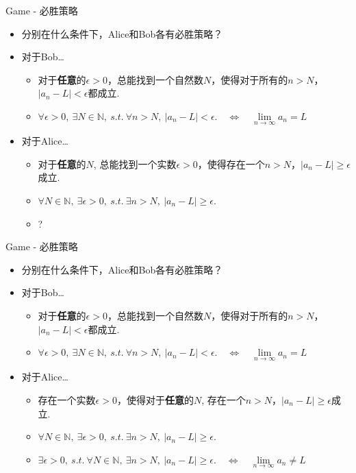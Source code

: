 \documentclass[]{beamer}
\begin{document}
\begin{frame}{Game - 必胜策略}
    \begin{itemize}
        \item 分别在什么条件下，Alice和Bob各有必胜策略？
        \item 对于Bob\dots
        \begin{itemize}
            \item 对于\textbf{任意}的$\epsilon>0$，总能找到一个自然数$N$，使得对于所有的$n>N$，$|a_n-L|<\epsilon$都成立.
            \item $\forall \epsilon >0,\ \exists N\in \mathbb{N},\ s.t.\ \forall n>N,\ |a_n-L|<\epsilon.\quad \Leftrightarrow\quad \lim\limits_{n\rightarrow\infty}a_n=L$
        \end{itemize}
        \item 对于Alice\dots
        \begin{itemize}
            \item 对于\textbf{任意}的$N$, 总能找到一个实数$\epsilon >0$，使得存在一个$n>N$，$|a_n-L|\ge\epsilon$成立.
            \item $\forall N\in\mathbb{N},\ \exists \epsilon>0,\ s.t.\ \exists n>N,\ |a_n-L|\ge\epsilon.$
            \item \color{red}?
        \end{itemize}
    \end{itemize}
\end{frame}

\begin{frame}{Game - 必胜策略}
    \begin{itemize}
        \item 分别在什么条件下，Alice和Bob各有必胜策略？
        \item 对于Bob\dots
        \begin{itemize}
            \item 对于\textbf{任意}的$\epsilon>0$，总能找到一个自然数$N$，使得对于所有的$n>N$，$|a_n-L|<\epsilon$都成立.
            \item $\forall \epsilon >0,\ \exists N\in \mathbb{N},\ s.t.\ \forall n>N,\ |a_n-L|<\epsilon.\quad \Leftrightarrow\quad \lim\limits_{n\rightarrow\infty}a_n=L$
        \end{itemize}
        \item 对于Alice\dots
        \begin{itemize}
            \item 存在一个实数$\epsilon >0$，使得对于\textbf{任意}的$N$, 存在一个$n>N$，$|a_n-L|\ge\epsilon$成立.
            \item $\forall N\in\mathbb{N},\ \exists \epsilon>0,\ s.t.\ \exists n>N,\ |a_n-L|\ge\epsilon.$
            \item $\exists \epsilon>0,\ s.t.\ \forall N\in\mathbb{N},\ \exists n>N,\ |a_n-L|\ge\epsilon.\quad \Leftrightarrow \quad \lim\limits_{n\rightarrow\infty}a_n\ne L$
        \end{itemize}
    \end{itemize}
\end{frame}
\end{document}
